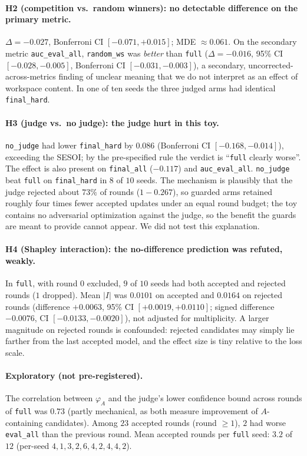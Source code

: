\documentclass[11pt]{article}
\newcommand{\fh}{\texttt{final\_hard}}
\newcommand{\fa}{\texttt{final\_all}}
\newcommand{\auc}{\texttt{auc\_eval\_all}}
\begin{document}
\paragraph{H2 (competition vs.\ random winners): no detectable difference on the primary metric.} $\Delta=-0.027$, Bonferroni CI $[-0.071,+0.015]$; MDE $\approx0.061$.
On the secondary metric \auc{}, \texttt{random\_ws} was \emph{better} than \texttt{full} ($\Delta=-0.016$, 95\% CI $[-0.028,-0.005]$, Bonferroni CI $[-0.031,-0.003]$), a secondary, uncorrected-across-metrics
finding of unclear meaning that we do not interpret as an effect of workspace content. In one of ten seeds the three judged arms had identical \fh{}.

\paragraph{H3 (judge vs.\ no judge): the judge hurt in this toy.} \texttt{no\_judge} had lower \fh{} by $0.086$ (Bonferroni CI $[-0.168,-0.014]$), exceeding the SESOI; by the pre-specified rule the verdict is
``\texttt{full} clearly worse''. The effect is also present on \fa{} ($-0.117$) and \auc{}. \texttt{no\_judge} beat \texttt{full} on \fh{} in $8$ of $10$ seeds.
The mechanism is plausibly that the judge rejected about $73\%$ of rounds ($1-0.267$), so guarded arms retained roughly four times fewer accepted updates under an equal round budget;
the toy contains no adversarial optimization against the judge, so the benefit the guards are meant to provide cannot appear. We did not test this explanation.

\paragraph{H4 (Shapley interaction): the no-difference prediction was refuted, weakly.} In \texttt{full}, with round $0$ excluded, $9$ of $10$ seeds had both accepted and rejected rounds ($1$ dropped).
Mean $|I|$ was $0.0101$ on accepted and $0.0164$ on rejected rounds (difference $+0.0063$, 95\% CI $[+0.0019,+0.0110]$; signed difference $-0.0076$, CI $[-0.0133,-0.0020]$), not adjusted for multiplicity.
A larger magnitude on rejected rounds is confounded: rejected candidates may simply lie farther from the last accepted model, and the effect size is tiny relative to the loss scale.

\paragraph{Exploratory (not pre-registered).} The correlation between $\varphi_A$ and the judge's lower confidence bound across rounds of \texttt{full} was $0.73$ (partly mechanical, as both measure improvement of $A$-containing candidates).
Among $23$ accepted rounds (round $\ge1$), $2$ had worse \texttt{eval\_all} than the previous round. Mean accepted rounds per \texttt{full} seed: $3.2$ of $12$ (per-seed $4,1,3,2,6,4,2,4,4,2$).
\end{document}

